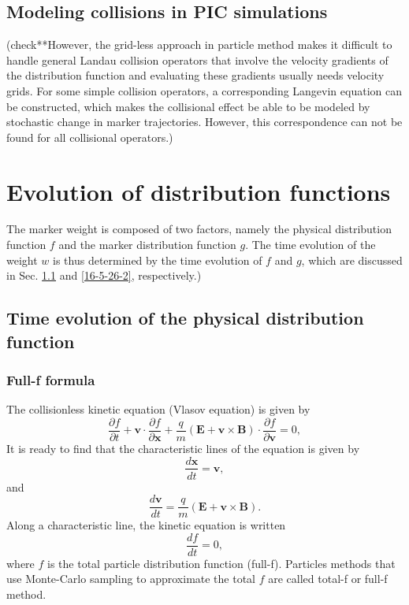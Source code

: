 \documentclass{article}
\begin{document}
\subsection{Modeling collisions in PIC simulations}

(check**However, the grid-less approach in particle method makes it difficult
to handle general Landau collision operators that involve the velocity
gradients of the distribution function and evaluating these gradients usually
needs velocity grids. For some simple collision operators, a corresponding
Langevin equation can be constructed, which makes the collisional effect be
able to be modeled by stochastic change in marker trajectories. However, this
correspondence can not be found for all collisional operators.)

\section{Evolution of distribution functions}

The marker weight is composed of two factors, namely the physical distribution
function $f$ and the marker distribution function $g$. The time evolution of
the weight $w$ is thus determined by the time evolution of $f$ and $g$, which
are discussed in Sec. \ref{16-5-26-1} and \ref{16-5-26-2}, respectively.)

\subsection{Time evolution of the physical distribution
function}\label{16-5-26-1}

\subsubsection{Full-f formula}

The collisionless kinetic equation (Vlasov equation) is given by
\begin{equation}
  \label{17-3-13-e1} \frac{\partial f}{\partial t} +\mathbf{v} \cdot
  \frac{\partial f}{\partial \mathbf{x}} + \frac{q}{m} (\mathbf{E}+\mathbf{v}
  \times \mathbf{B}) \cdot \frac{\partial f}{\partial \mathbf{v}} = 0,
\end{equation}
It is ready to find that the characteristic lines of the equation is given by
\begin{equation}
  \label{17-3-13-e2} \frac{d\mathbf{x}}{d t} =\mathbf{v},
\end{equation}
and
\begin{equation}
  \label{17-3-13-e3} \frac{d\mathbf{v}}{d t} = \frac{q}{m}
  (\mathbf{E}+\mathbf{v} \times \mathbf{B}) .
\end{equation}
Along a characteristic line, the kinetic equation is written
\begin{equation}
  \label{3-8-p1} \frac{d f}{d t} = 0,
\end{equation}
where $f$ is the total particle distribution function (full-f). Particles
methods that use Monte-Carlo sampling to approximate the total $f$ are called
total-f or full-f method.
\end{document}

